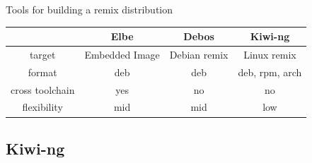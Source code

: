 \documentclass{beamer}
\begin{document}
\begin{frame}{Tools for building a remix distribution}
	\begin{tabular}{c|ccc}
		& \textbf{Elbe} & \textbf{Debos} & \textbf{Kiwi-ng} \\
		\hline
		target & Embedded Image & Debian remix & Linux remix \\ 
		format & deb & deb & deb, rpm, arch \\
		cross toolchain & yes & no & no \\
		flexibility & mid & mid & low \\
	\end{tabular}
\end{frame}

\subsection{Kiwi-ng}
\end{document}
